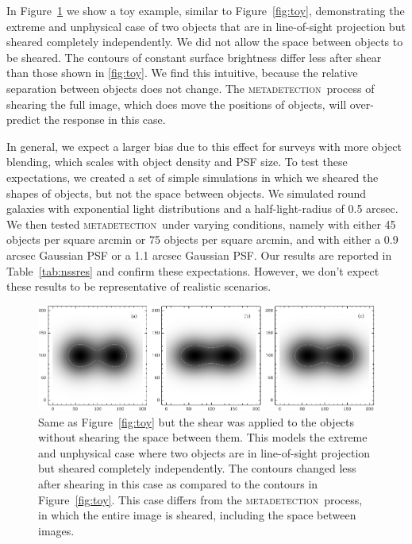 \documentclass[iop, twocolappendix, appendixfloats, numberedappendix, apj]{hackemulateapj}
\newcommand{\mdet}{\textsc{metadetection}}
\begin{document}
In Figure~\ref{fig:toynoscene} we show a toy example, similar to
Figure~\ref{fig:toy}, demonstrating the extreme and unphysical case of two
objects that are in line-of-sight projection but sheared completely
independently.  We did not allow the space between objects to be sheared. The
contours of constant surface brightness differ less after shear than those
shown in \ref{fig:toy}.  We find this intuitive, because the relative separation
between objects does not change.  The \mdet\ process of shearing the full
image, which does move the positions of objects, will over-predict the response
in this case.

In general, we expect a larger bias due to this effect for surveys with more
object blending, which scales with object density and PSF size.  To test these
expectations, we created a set of simple simulations in which we sheared the
shapes of objects, but not the space between objects.  We simulated round
galaxies with exponential light distributions and a half-light-radius of 0.5
arcsec. We then tested \mdet\ under varying conditions, namely with either 45
objects per square arcmin or 75 objects per square arcmin, and with either a
0.9 arcsec Gaussian PSF or a 1.1 arcsec Gaussian PSF. Our results are reported
in Table~\ref{tab:nssres} and confirm these expectations. However, we don't
expect these results to be representative of realistic scenarios.


\begin{figure}
    \begin{center}
        \includegraphics[width=\textwidth]{toy-no-full-scene.pdf}

        \caption{Same as Figure~\ref{fig:toy} but the shear was applied to the
        objects without shearing the space between them. This models the extreme
        and unphysical case where two objects are in line-of-sight projection but
        sheared completely independently.  The contours changed less after shearing
        in this case as compared to the contours in Figure~\ref{fig:toy}.  This
        case differs from the \mdet\ process, in which the entire image is sheared,
        including the space between images.  \label{fig:toynoscene} }
    \end{center}

\end{figure}
\end{document}
